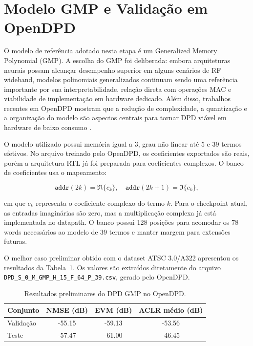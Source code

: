 \documentclass[journal,comsoc]{IEEEtran}
\begin{document}
\section{Modelo GMP e Validação em OpenDPD}
O modelo de referência adotado nesta etapa é um Generalized Memory Polynomial (GMP). A escolha do GMP foi deliberada: embora arquiteturas neurais possam alcançar desempenho superior em alguns cenários de RF wideband, modelos polinomiais generalizados continuam sendo uma referência importante por sua interpretabilidade, relação direta com operações MAC e viabilidade de implementação em hardware dedicado. Além disso, trabalhos recentes em OpenDPD mostram que a redução de complexidade, a quantização e a organização do modelo são aspectos centrais para tornar DPD viável em hardware de baixo consumo \cite{wu_mpdpd_2024,wu_opendpdv2_2025}.

O modelo utilizado possui memória igual a 3, grau não linear até 5 e 39 termos efetivos. No arquivo treinado pelo OpenDPD, os coeficientes exportados são reais, porém a arquitetura RTL já foi preparada para coeficientes complexos. O banco de coeficientes usa o mapeamento:

\begin{equation}
    \texttt{addr}(2k) = \Re\{c_k\}, \quad
    \texttt{addr}(2k+1) = \Im\{c_k\},
\end{equation}

em que \(c_k\) representa o coeficiente complexo do termo \(k\). Para o checkpoint atual, as entradas imaginárias são zero, mas a multiplicação complexa já está implementada no datapath. O banco possui 128 posições para acomodar os 78 words necessários ao modelo de 39 termos e manter margem para extensões futuras.

O melhor caso preliminar obtido com o dataset ATSC 3.0/A322 apresentou os resultados da Tabela~\ref{tab:opendpd_resultados}. Os valores são extraídos diretamente do arquivo \texttt{DPD\_S\_0\_M\_GMP\_H\_15\_F\_64\_P\_39.csv}, gerado pelo OpenDPD.

\begin{table}[!htb]
    \centering
    \caption{Resultados preliminares do DPD GMP no OpenDPD.}
    \label{tab:opendpd_resultados}
    \begin{tabular}{lccc}
        \hline
        Conjunto & NMSE (dB) & EVM (dB) & ACLR médio (dB) \\
        \hline
        Validação & -55.15 & -59.13 & -53.56 \\
        Teste     & -57.47 & -61.00 & -46.45 \\
        \hline
    \end{tabular}
\end{table}
\end{document}
